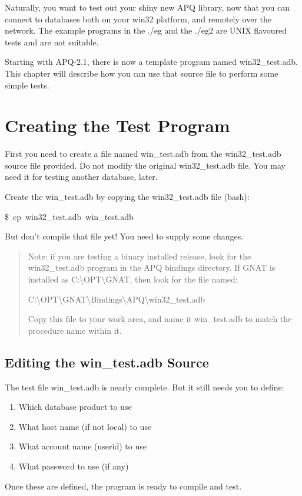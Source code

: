 \documentclass[english]{report}
\newenvironment{lyxcode}
   {\begin{list}{}{
     \setlength{\rightmargin}{\leftmargin}
     \setlength{\listparindent}{0pt}%
     \raggedright
     \setlength{\itemsep}{0pt}
     \setlength{\parsep}{0pt}
     \normalfont\ttfamily}%
    \item[]}
   {\end{list}}
\begin{document}
Naturally, you want to test out your shiny new APQ library, now that
you can connect to databases both on your win32 platform, and remotely
over the network. The example programs in the ./eg and the ./eg2 are
UNIX flavoured tests and are not suitable.

Starting with APQ-2.1, there is now a template program named win32\_test.adb.
This chapter will describe how you can use that source file to perform
some simple tests.


\section{Creating the Test Program}

First you need to create a file named win\_test.adb from the win32\_test.adb
source file provided. Do not modify the original win32\_test.adb file.
You may need it for testing another database, later.

Create the win\_test.adb by copying the win32\_test.adb file (bash):

\begin{lyxcode}
\$~cp~win32\_test.adb~win\_test.adb
\end{lyxcode}
But don't compile that file yet! You need to supply some changes.

\begin{quote}
Note: if you are testing a binary installed release, look for the
win32\_test.adb program in the APQ bindings directory. If GNAT is
installed as C:\textbackslash{}OPT\textbackslash{}GNAT, then look
for the file named:

C:\textbackslash{}OPT\textbackslash{}GNAT\textbackslash{}Bindings\textbackslash{}APQ\textbackslash{}win32\_test.adb

Copy this file to your work area, and name it win\_test.adb to match
the procedure name within it.
\end{quote}

\subsection{Editing the win\_test.adb Source}

The test file win\_test.adb is nearly complete. But it still needs
you to define:

\begin{enumerate}
\item Which database product to use
\item What host name (if not local) to use
\item What account name (userid) to use
\item What password to use (if any)
\end{enumerate}
Once these are defined, the program is ready to compile and test.
\end{document}
